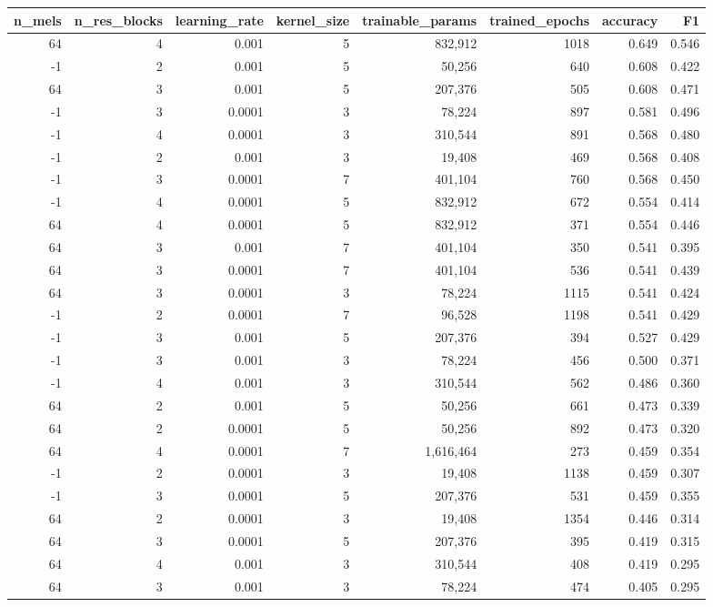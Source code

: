 \begin{tabular}{rrrrrrrr}
\toprule
\textbf{n\_mels} & \textbf{n\_res\_blocks} & \textbf{learning\_rate} & \textbf{kernel\_size}& \textbf{trainable\_params} & \textbf{trained\_epochs} & \textbf{accuracy} & \textbf{F1} \\
\midrule
64 & 4 & 0.001 & 5 & 832,912 & 1018 & 0.649 & 0.546 \\
-1 & 2 & 0.001 & 5 & 50,256 & 640 & 0.608 & 0.422 \\
64 & 3 & 0.001 & 5 & 207,376 & 505 & 0.608 & 0.471 \\
-1 & 3 & 0.0001 & 3 & 78,224 & 897 & 0.581 & 0.496 \\
-1 & 4 & 0.0001 & 3 & 310,544 & 891 & 0.568 & 0.480 \\
-1 & 2 & 0.001 & 3 & 19,408 & 469 & 0.568 & 0.408 \\
-1 & 3 & 0.0001 & 7 & 401,104 & 760 & 0.568 & 0.450 \\
-1 & 4 & 0.0001 & 5 & 832,912 & 672 & 0.554 & 0.414 \\
64 & 4 & 0.0001 & 5 & 832,912 & 371 & 0.554 & 0.446 \\
64 & 3 & 0.001 & 7 & 401,104 & 350 & 0.541 & 0.395 \\
64 & 3 & 0.0001 & 7 & 401,104 & 536 & 0.541 & 0.439 \\
64 & 3 & 0.0001 & 3 & 78,224 & 1115 & 0.541 & 0.424 \\
-1 & 2 & 0.0001 & 7 & 96,528 & 1198 & 0.541 & 0.429 \\
-1 & 3 & 0.001 & 5 & 207,376 & 394 & 0.527 & 0.429 \\
-1 & 3 & 0.001 & 3 & 78,224 & 456 & 0.500 & 0.371 \\
-1 & 4 & 0.001 & 3 & 310,544 & 562 & 0.486 & 0.360 \\
64 & 2 & 0.001 & 5 & 50,256 & 661 & 0.473 & 0.339 \\
64 & 2 & 0.0001 & 5 & 50,256 & 892 & 0.473 & 0.320 \\
64 & 4 & 0.0001 & 7 & 1,616,464 & 273 & 0.459 & 0.354 \\
-1 & 2 & 0.0001 & 3 & 19,408 & 1138 & 0.459 & 0.307 \\
-1 & 3 & 0.0001 & 5 & 207,376 & 531 & 0.459 & 0.355 \\
64 & 2 & 0.0001 & 3 & 19,408 & 1354 & 0.446 & 0.314 \\
64 & 3 & 0.0001 & 5 & 207,376 & 395 & 0.419 & 0.315 \\
64 & 4 & 0.001 & 3 & 310,544 & 408 & 0.419 & 0.295 \\
64 & 3 & 0.001 & 3 & 78,224 & 474 & 0.405 & 0.295 \\

\end{tabular}
